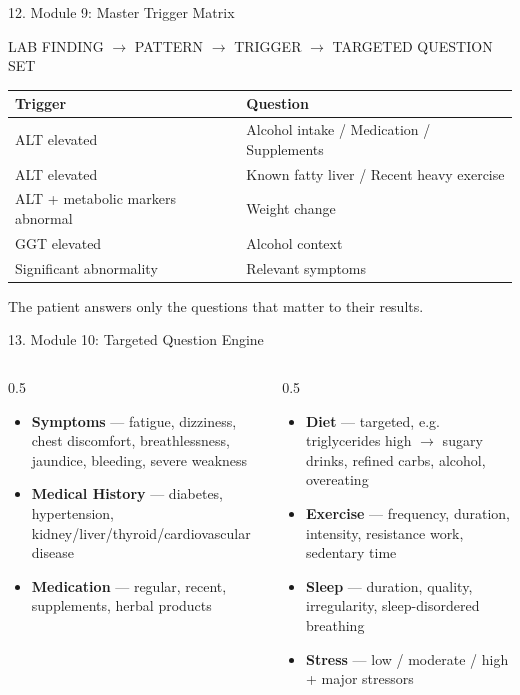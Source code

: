 \documentclass[10pt,aspectratio=169]{beamer}
\begin{document}
\begin{frame}{12. Module 9: Master Trigger Matrix}
\begin{center}
\small
LAB FINDING $\rightarrow$ PATTERN $\rightarrow$ TRIGGER $\rightarrow$ TARGETED QUESTION SET
\end{center}
\vspace{6pt}
\scriptsize
\begin{center}
\begin{tabular}{ll}
\toprule
Trigger & Question \\
\midrule
ALT elevated & Alcohol intake / Medication / Supplements \\
ALT elevated & Known fatty liver / Recent heavy exercise \\
ALT + metabolic markers abnormal & Weight change \\
GGT elevated & Alcohol context \\
Significant abnormality & Relevant symptoms \\
\bottomrule
\end{tabular}
\end{center}
The patient answers only the questions that matter to their results.
\end{frame}

\begin{frame}{13. Module 10: Targeted Question Engine}
\scriptsize
\begin{columns}[T]
\begin{column}{0.5\textwidth}
\begin{itemize}
\item \textbf{Symptoms} --- fatigue, dizziness, chest discomfort, breathlessness, jaundice, bleeding, severe weakness
\item \textbf{Medical History} --- diabetes, hypertension, kidney/liver/thyroid/cardiovascular disease
\item \textbf{Medication} --- regular, recent, supplements, herbal products
\end{itemize}
\end{column}
\begin{column}{0.5\textwidth}
\begin{itemize}
\item \textbf{Diet} --- targeted, e.g. triglycerides high $\to$ sugary drinks, refined carbs, alcohol, overeating
\item \textbf{Exercise} --- frequency, duration, intensity, resistance work, sedentary time
\item \textbf{Sleep} --- duration, quality, irregularity, sleep-disordered breathing
\item \textbf{Stress} --- low / moderate / high + major stressors
\end{itemize}
\end{column}
\end{columns}
\end{frame}
\end{document}
